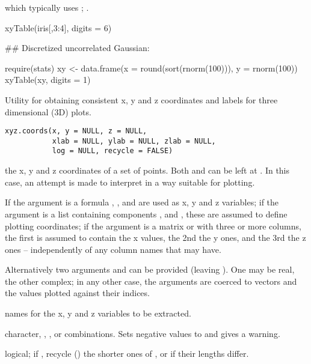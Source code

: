 %
\begin{SeeAlso}\relax
{} which typically uses
; .
\end{SeeAlso}
%
\begin{Examples}
\begin{ExampleCode}
xyTable(iris[,3:4], digits = 6)

## Discretized uncorrelated Gaussian:

require(stats)
xy <- data.frame(x = round(sort(rnorm(100))), y = rnorm(100))
xyTable(xy, digits = 1)
\end{ExampleCode}
\end{Examples}
%
\begin{Description}\relax
Utility for obtaining consistent x, y and z coordinates and labels
for three dimensional (3D) plots.
\end{Description}
%
\begin{Usage}
\begin{verbatim}
xyz.coords(x, y = NULL, z = NULL,
           xlab = NULL, ylab = NULL, zlab = NULL,
           log = NULL, recycle = FALSE)
\end{verbatim}
\end{Usage}
%
\begin{Arguments}
\begin{ldescription}
\item[\code{x, y, z}] the x, y and z coordinates of a set of points.
Both  and  can be left at .  In this
case, an attempt is made to interpret  in a way suitable for
plotting.

If the argument is a formula ,
,  and  are used as x, y and z
variables;
if the argument is a list containing components ,
 and , these are assumed to define plotting coordinates;
if the argument is a matrix or  with three
or more columns, the first is
assumed to contain the x values, the 2nd the y ones, and the 3rd the
z ones -- independently of any column names that  may have.

Alternatively two arguments  and  can be provided
(leaving ).  One may be real, the other complex;
in any other case, the arguments are coerced to vectors
and the values plotted against their indices.

\item[\code{xlab, ylab, zlab}] names for the x, y and z variables to be extracted.
\item[\code{log}] character, , ,  or combinations.
Sets negative values to  and gives a warning.
\item[\code{recycle}] logical; if , recycle () the
shorter ones of ,  or  if their lengths differ.
\end{ldescription}
\end{Arguments}

